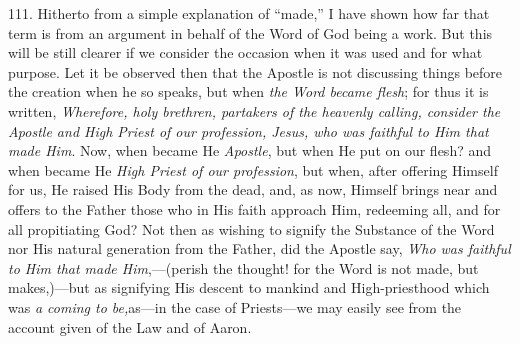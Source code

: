 111. Hitherto from a simple
explanation of ``made,'' I have shown how far that term is from an
argument in behalf of the Word of God being a work. But this will be
still clearer if we consider the occasion when it was used and for
what purpose. Let it be observed then that the Apostle is not
discussing things before the creation when he so speaks, but when \emph{the
Word became flesh}; for thus it is written, \emph{Wherefore, holy
brethren, partakers of the heavenly calling, consider the Apostle and
High Priest of our profession, Jesus, who was faithful to Him that
made Him}. Now, when became He \emph{Apostle}, but when He put on
our flesh? and when became He \emph{High Priest of our profession},
but when, after offering Himself for us, He raised His Body from the
dead, and, as now, Himself brings near and offers to the Father those
who in His faith approach Him, redeeming all, and for all propitiating
God? Not then as wishing to signify the Substance of the Word nor His
natural generation from the Father, did the Apostle say, \emph{Who was
faithful to Him that made Him},—(perish the thought! for the Word
is not made, but makes,)—but as signifying His descent to mankind
and High-priesthood which was \emph{a coming to be,}as—in the case
of Priests—we may easily see from the account given of the Law and
of Aaron.

